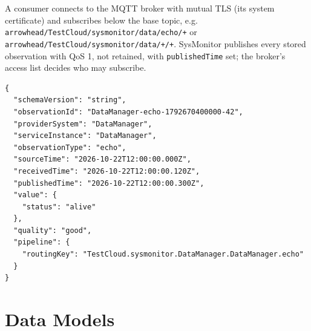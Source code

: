 \documentclass[a4paper]{arrowhead}
\begin{document}
A consumer connects to the MQTT broker with mutual TLS (its system certificate) and subscribes below the base topic, e.g. \texttt{arrowhead/\allowbreak{}Test\allowbreak{}Cloud/\allowbreak{}sysmonitor/\allowbreak{}data/\allowbreak{}echo/\allowbreak{}+} or \texttt{arrowhead/\allowbreak{}Test\allowbreak{}Cloud/\allowbreak{}sysmonitor/\allowbreak{}data/\allowbreak{}+/\allowbreak{}+}. SysMonitor publishes every stored observation with QoS 1, not retained, with \texttt{publishedTime} set; the broker's access list decides who may subscribe.

\begin{lstlisting}[caption={A published observation.}]
{
  "schemaVersion": "string",
  "observationId": "DataManager-echo-1792670400000-42",
  "providerSystem": "DataManager",
  "serviceInstance": "DataManager",
  "observationType": "echo",
  "sourceTime": "2026-10-22T12:00:00.000Z",
  "receivedTime": "2026-10-22T12:00:00.120Z",
  "publishedTime": "2026-10-22T12:00:00.300Z",
  "value": {
    "status": "alive"
  },
  "quality": "good",
  "pipeline": {
    "routingKey": "TestCloud.sysmonitor.DataManager.DataManager.echo"
  }
}
\end{lstlisting}

\newpage

\section{Data Models}
\label{sec:model}

\end{document}
